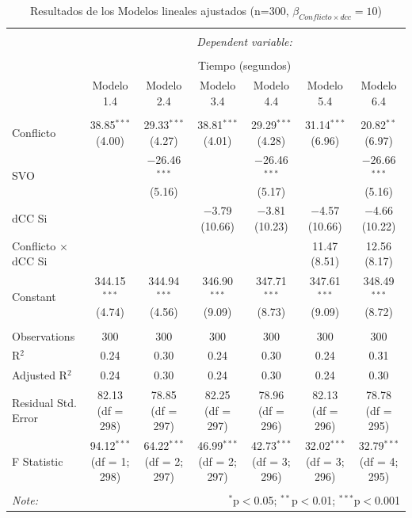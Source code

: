 \documentclass[
  spanish,
  10pt,
]{article}
\begin{document}
\begin{table}[H] \centering 
  \caption{Resultados de los Modelos lineales ajustados (n=300, $\beta_{Conflicto \times dcc} = 10$)} 
  \label{} 
\tiny 
\begin{tabular}{@{\extracolsep{5pt}}lcccccc} 
\\[-1.8ex]\hline 
\hline \\[-1.8ex] 
 & \multicolumn{6}{c}{\textit{Dependent variable:}} \\ 
\cline{2-7} 
\\[-1.8ex] & \multicolumn{6}{c}{Tiempo (segundos)} \\ 
 & Modelo 1.4 & Modelo 2.4 & Modelo 3.4 & Modelo 4.4 & Modelo 5.4 & Modelo 6.4 \\ 
\hline \\[-1.8ex] 
 Conflicto & 38.85$^{***}$ (4.00) & 29.33$^{***}$ (4.27) & 38.81$^{***}$ (4.01) & 29.29$^{***}$ (4.28) & 31.14$^{***}$ (6.96) & 20.82$^{**}$ (6.97) \\ 
  SVO &  & $-$26.46$^{***}$ (5.16) &  & $-$26.46$^{***}$ (5.17) &  & $-$26.66$^{***}$ (5.16) \\ 
  dCC Si &  &  & $-$3.79 (10.66) & $-$3.81 (10.23) & $-$4.57 (10.66) & $-$4.66 (10.22) \\ 
  Conflicto $\times$ dCC Si &  &  &  &  & 11.47 (8.51) & 12.56 (8.17) \\ 
  Constant & 344.15$^{***}$ (4.74) & 344.94$^{***}$ (4.56) & 346.90$^{***}$ (9.09) & 347.71$^{***}$ (8.73) & 347.61$^{***}$ (9.09) & 348.49$^{***}$ (8.72) \\ 
 \hline \\[-1.8ex] 
Observations & 300 & 300 & 300 & 300 & 300 & 300 \\ 
R$^{2}$ & 0.24 & 0.30 & 0.24 & 0.30 & 0.24 & 0.31 \\ 
Adjusted R$^{2}$ & 0.24 & 0.30 & 0.24 & 0.30 & 0.24 & 0.30 \\ 
Residual Std. Error & 82.13 (df = 298) & 78.85 (df = 297) & 82.25 (df = 297) & 78.96 (df = 296) & 82.13 (df = 296) & 78.78 (df = 295) \\ 
F Statistic & 94.12$^{***}$ (df = 1; 298) & 64.22$^{***}$ (df = 2; 297) & 46.99$^{***}$ (df = 2; 297) & 42.73$^{***}$ (df = 3; 296) & 32.02$^{***}$ (df = 3; 296) & 32.79$^{***}$ (df = 4; 295) \\ 
\hline 
\hline \\[-1.8ex] 
\textit{Note:}  & \multicolumn{6}{r}{$^{*}$p$<$0.05; $^{**}$p$<$0.01; $^{***}$p$<$0.001} \\ 
\end{tabular} 
\end{table}
\end{document}

